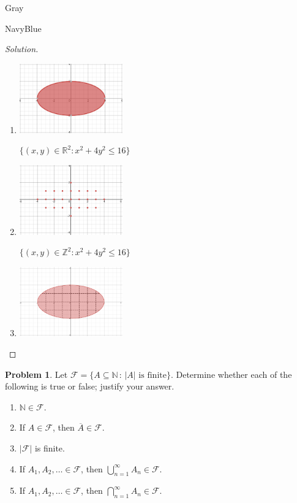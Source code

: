 \documentclass[12pt]{amsart}
\newcounter{problem_number}[section]
\theoremstyle{named}
\newenvironment{soln}
{\begin{color}{Gray}\begin{framed}\begin{color}{NavyBlue}\begin{proof}[Solution]
\doublespacing}
{\end{proof}\end{color}\end{framed}\end{color}}
\theoremstyle{definition}
\newtheorem{problem}{Problem}
\newcommand{\N}{\mathbb N}
\newcommand{\Ff}{\mathcal F}
\begin{document}
\begin{soln}
    \phantom{ }
	\begin{enumerate}
        \item \phantom{ }
        
        \includegraphics[width=12em]{media/1.1.png}

        $\{(x,y) \in \mathbb R^2:x^2+4y^2\leq16\}$

        \item \phantom{ }
        
        \includegraphics[width=12em]{media/1.2.png}

        $\{(x,y) \in \mathbb Z^2:x^2+4y^2\leq16\}$

        \item \phantom{ }
        
        \includegraphics[width=12em]{media/1.3.png}
    \end{enumerate}
\end{soln}
\begin{problem}
	Let $\Ff = \{A\subseteq\N\,:\,|A| \text{ is finite}\}$.
	Determine whether each of the following is true or false; justify your answer.
	\begin{enumerate}
		\item $\N\in\Ff$.
		\item If $A\in\Ff$, then $\overline A\in\Ff$.
		\item $|\Ff|$ is finite.
		\item If $A_1, A_2,\ldots \in\Ff$, then $\displaystyle\bigcup_{n=1}^\infty A_n\in\Ff$.
		\item If $A_1, A_2,\ldots \in\Ff$, then $\displaystyle\bigcap_{n=1}^\infty A_n\in\Ff$.
	\end{enumerate}
	
\end{problem}
\end{document}

